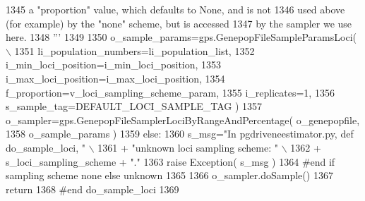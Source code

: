 \begin{DoxyCode}
1345 \textcolor{stringliteral}{        a "proportion" value, which defaults to None, and is not }
1346 \textcolor{stringliteral}{        used above (for example) by the "none" scheme, but is accessed}
1347 \textcolor{stringliteral}{        by the sampler we use here.}
1348 \textcolor{stringliteral}{        '''}
1349 
1350         o\_sample\_params=gps.GenepopFileSampleParamsLoci( \(\backslash\)
1351                                                 li\_population\_numbers=li\_population\_list,
1352                                                 i\_min\_loci\_position=i\_min\_loci\_position,
1353                                                 i\_max\_loci\_position=i\_max\_loci\_position,
1354                                                 f\_proportion=v\_loci\_sampling\_scheme\_param,
1355                                                 i\_replicates=1,
1356                                                 s\_sample\_tag=DEFAULT\_LOCI\_SAMPLE\_TAG )
1357         o\_sampler=gps.GenepopFileSamplerLociByRangeAndPercentage( o\_genepopfile,
1358                                                                     o\_sample\_params )
1359     \textcolor{keywordflow}{else}:
1360         s\_msg=\textcolor{stringliteral}{"In pgdriveneestimator.py, def do\_sample\_loci, "} \(\backslash\)
1361                     + \textcolor{stringliteral}{"unknown loci sampling scheme: "} \(\backslash\)
1362                     + s\_loci\_sampling\_scheme + \textcolor{stringliteral}{"."}
1363         \textcolor{keywordflow}{raise} Exception( s\_msg )
1364     \textcolor{comment}{#end if sampling scheme none else unknown}
1365 
1366     o\_sampler.doSample()
1367     \textcolor{keywordflow}{return}
1368 \textcolor{comment}{#end do\_sample\_loci}
1369 
\end{DoxyCode}
